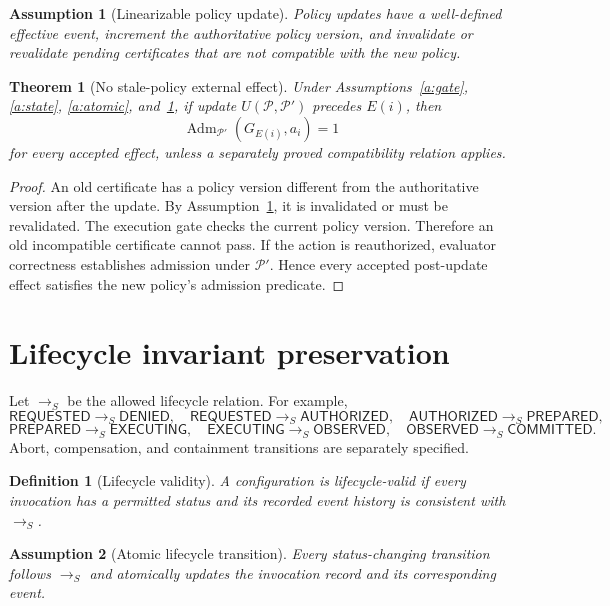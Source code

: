 \documentclass[11pt,a4paper]{article}
\newtheorem{definition}{Definition}[section]
\newtheorem{assumption}{Assumption}[section]
\newtheorem{theorem}{Theorem}[section]
\theoremstyle{remark}
\newcommand{\Adm}{\operatorname{Adm}}
\begin{document}
\begin{assumption}[Linearizable policy update]\label{a:pol}
Policy updates have a well-defined effective event, increment the authoritative policy version, and invalidate or revalidate pending certificates that are not compatible with the new policy.
\end{assumption}

\begin{theorem}[No stale-policy external effect]\label{thm:policy}
Under Assumptions~\ref{a:gate}, \ref{a:state}, \ref{a:atomic}, and~\ref{a:pol}, if update $U(\mathcal P,\mathcal P')$ precedes $E(i)$, then
\[
\Adm_{\mathcal P'}(G_{E(i)},a_i)=1
\]
for every accepted effect, unless a separately proved compatibility relation applies.
\end{theorem}

\begin{proof}
An old certificate has a policy version different from the authoritative version after the update. By Assumption~\ref{a:pol}, it is invalidated or must be revalidated. The execution gate checks the current policy version. Therefore an old incompatible certificate cannot pass. If the action is reauthorized, evaluator correctness establishes admission under $\mathcal P'$. Hence every accepted post-update effect satisfies the new policy's admission predicate.
\end{proof}

\section{Lifecycle invariant preservation}

Let $\rightarrow_S$ be the allowed lifecycle relation. For example,
\[
\mathsf{REQUESTED}\rightarrow_S\mathsf{DENIED},\quad
\mathsf{REQUESTED}\rightarrow_S\mathsf{AUTHORIZED},\quad
\mathsf{AUTHORIZED}\rightarrow_S\mathsf{PREPARED},
\]
\[
\mathsf{PREPARED}\rightarrow_S\mathsf{EXECUTING},\quad
\mathsf{EXECUTING}\rightarrow_S\mathsf{OBSERVED},\quad
\mathsf{OBSERVED}\rightarrow_S\mathsf{COMMITTED}.
\]
Abort, compensation, and containment transitions are separately specified.

\begin{definition}[Lifecycle validity]
A configuration is lifecycle-valid if every invocation has a permitted status and its recorded event history is consistent with $\rightarrow_S$.
\end{definition}

\begin{assumption}[Atomic lifecycle transition]\label{a:life}
Every status-changing transition follows $\rightarrow_S$ and atomically updates the invocation record and its corresponding event.
\end{assumption}
\end{document}

